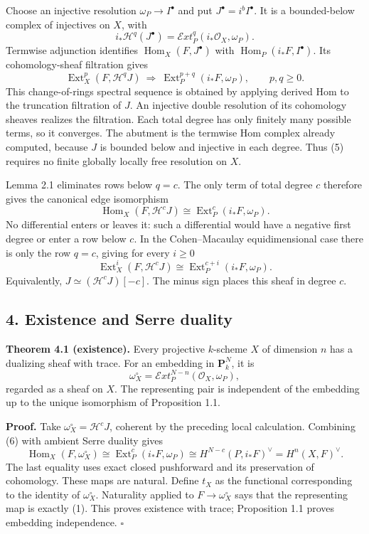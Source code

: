 \documentclass[11pt]{article}
\begin{document}
Choose an injective resolution \(\omega_P\to I^\bullet\) and put
\(J^\bullet=i^bI^\bullet\). It is a bounded-below complex of injectives
on \(X\), with \[
i_*\mathcal H^q(J^\bullet)
 =\mathcal E xt^q_P(i_*\mathcal O_X,\omega_P).
\tag{4}
\] Termwise adjunction identifies \(\operatorname{Hom}_X(F,J^\bullet)\)
with \(\operatorname{Hom}_P(i_*F,I^\bullet)\). Its cohomology-sheaf
filtration gives \[
\operatorname{Ext}^p_X(F,\mathcal H^qJ)
 \ \Longrightarrow\ \operatorname{Ext}^{p+q}_P(i_*F,\omega_P),
\qquad p,q\geq0.
\tag{5}
\] This change-of-rings spectral sequence is obtained by applying
derived Hom to the truncation filtration of \(J\). An injective double
resolution of its cohomology sheaves realizes the filtration. Each total
degree has only finitely many possible terms, so it converges. The
abutment is the termwise Hom complex already computed, because \(J\) is
bounded below and injective in each degree. Thus (5) requires no finite
globally locally free resolution on \(X\).

Lemma 2.1 eliminates rows below \(q=c\). The only term of total degree
\(c\) therefore gives the canonical edge isomorphism \[
\operatorname{Hom}_X(F,\mathcal H^cJ)
 \cong\operatorname{Ext}^c_P(i_*F,\omega_P).
\tag{6}
\] No differential enters or leaves it: such a differential would have a
negative first degree or enter a row below \(c\). In the Cohen--Macaulay
equidimensional case there is only the row \(q=c\), giving for every
\(i\geq0\) \[
\operatorname{Ext}^i_X(F,\mathcal H^cJ)
 \cong\operatorname{Ext}^{c+i}_P(i_*F,\omega_P).
\tag{7}
\] Equivalently, \(J\simeq(\mathcal H^cJ)[-c]\). The minus sign places
this sheaf in degree \(c\).

\subsection{4. Existence and Serre
duality}\label{existence-and-serre-duality}

\textbf{Theorem 4.1 (existence).} Every projective \(k\)-scheme \(X\) of
dimension \(n\) has a dualizing sheaf with trace. For an embedding in
\(\mathbf P^N_k\), it is \[
\omega_X^\circ=\mathcal E xt^{N-n}_P(\mathcal O_X,\omega_P),
\tag{8}
\] regarded as a sheaf on \(X\). The representing pair is independent of
the embedding up to the unique isomorphism of Proposition 1.1.

\textbf{Proof.} Take \(\omega_X^\circ=\mathcal H^cJ\), coherent by the
preceding local calculation. Combining (6) with ambient Serre duality
gives \[
\operatorname{Hom}_X(F,\omega_X^\circ)
 \cong\operatorname{Ext}^c_P(i_*F,\omega_P)
 \cong H^{N-c}(P,i_*F)^\vee
 =H^n(X,F)^\vee.
\] The last equality uses exact closed pushforward and its preservation
of cohomology. These maps are natural. Define \(t_X\) as the functional
corresponding to the identity of \(\omega_X^\circ\). Naturality applied
to \(F\to\omega_X^\circ\) says that the representing map is exactly (1).
This proves existence with trace; Proposition 1.1 proves embedding
independence. \(\square\)
\end{document}
